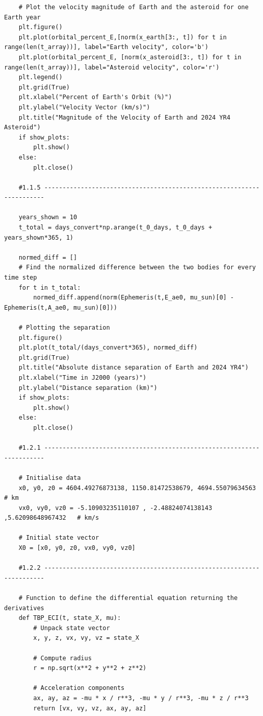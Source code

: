 \documentclass[12pt,twocolumn]{article}  %
\begin{document}
\begin{lstlisting}
    # Plot the velocity magnitude of Earth and the asteroid for one Earth year
    plt.figure()
    plt.plot(orbital_percent_E,[norm(x_earth[3:, t]) for t in range(len(t_array))], label="Earth velocity", color='b')
    plt.plot(orbital_percent_E, [norm(x_asteroid[3:, t]) for t in range(len(t_array))], label="Asteroid velocity", color='r')
    plt.legend()
    plt.grid(True)
    plt.xlabel("Percent of Earth's Orbit (%)")
    plt.ylabel("Velocity Vector (km/s)")
    plt.title("Magnitude of the Velocity of Earth and 2024 YR4 Asteroid")
    if show_plots:
        plt.show()
    else:
        plt.close()
        
    #1.1.5 ----------------------------------------------------------------------
    
    years_shown = 10
    t_total = days_convert*np.arange(t_0_days, t_0_days + years_shown*365, 1)
    
    normed_diff = []
    # Find the normalized difference between the two bodies for every time step
    for t in t_total:
        normed_diff.append(norm(Ephemeris(t,E_ae0, mu_sun)[0] - Ephemeris(t,A_ae0, mu_sun)[0]))
        
    # Plotting the separation   
    plt.figure()
    plt.plot(t_total/(days_convert*365), normed_diff)
    plt.grid(True)
    plt.title("Absolute distance separation of Earth and 2024 YR4")
    plt.xlabel("Time in J2000 (years)")
    plt.ylabel("Distance separation (km)")
    if show_plots:
        plt.show()
    else:
        plt.close()
    
    #1.2.1 ----------------------------------------------------------------------
    
    # Initialise data
    x0, y0, z0 = 4604.49276873138, 1150.81472538679, 4694.55079634563   # km
    vx0, vy0, vz0 = -5.10903235110107 , -2.48824074138143 ,5.62098648967432   # km/s
    
    # Initial state vector
    X0 = [x0, y0, z0, vx0, vy0, vz0]    
    
    #1.2.2 ----------------------------------------------------------------------
    
    # Function to define the differential equation returning the derivatives
    def TBP_ECI(t, state_X, mu):
        # Unpack state vector
        x, y, z, vx, vy, vz = state_X 
        
        # Compute radius
        r = np.sqrt(x**2 + y**2 + z**2)  
        
        # Acceleration components
        ax, ay, az = -mu * x / r**3, -mu * y / r**3, -mu * z / r**3  
        return [vx, vy, vz, ax, ay, az]  
    

\end{lstlisting}
\end{document}
